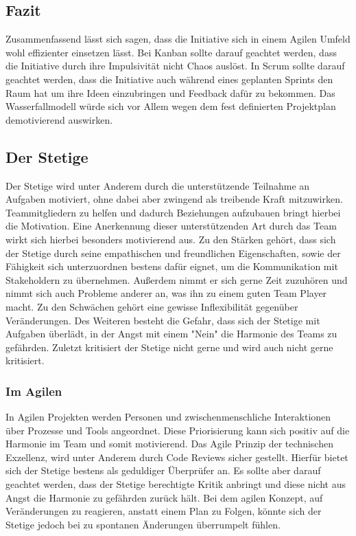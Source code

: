 \documentclass[twocolumn,10pt]{asme2ej}
\begin{document}
\subsection{Fazit}
Zusammenfassend lässt sich sagen, dass die Initiative sich in einem Agilen Umfeld wohl effizienter einsetzen lässt. Bei Kanban sollte darauf geachtet werden, dass die Initiative durch ihre Impulsivität nicht Chaos auslöst. In Scrum sollte darauf geachtet werden, dass die Initiative auch während eines geplanten Sprints den Raum hat um ihre Ideen einzubringen und Feedback dafür zu bekommen. Das Wasserfallmodell würde sich vor Allem wegen dem fest definierten Projektplan demotivierend auswirken. 


\subsection{Der Stetige}
Der Stetige wird unter Anderem durch die unterstützende Teilnahme an Aufgaben motiviert, ohne dabei aber zwingend als treibende Kraft mitzuwirken. Teammitgliedern zu helfen und dadurch Beziehungen aufzubauen bringt hierbei die Motivation. Eine Anerkennung dieser unterstützenden Art durch das Team wirkt sich hierbei besonders motivierend aus. Zu den Stärken gehört, dass sich der Stetige durch seine empathischen und freundlichen Eigenschaften, sowie der Fähigkeit sich unterzuordnen bestens dafür eignet, um die Kommunikation mit Stakeholdern zu übernehmen. Außerdem nimmt er sich gerne Zeit zuzuhören und nimmt sich auch Probleme anderer an, was ihn zu einem guten Team Player macht. Zu den Schwächen gehört eine gewisse Inflexibilität gegenüber Veränderungen. Des Weiteren besteht die Gefahr, dass sich der Stetige mit Aufgaben überlädt, in der Angst mit einem "Nein" die Harmonie des Teams zu gefährden. Zuletzt kritisiert der Stetige nicht gerne und wird auch nicht gerne kritisiert.

\subsubsection{Im Agilen}
In Agilen Projekten werden Personen und zwischenmenschliche Interaktionen über Prozesse und Tools angeordnet. Diese Priorisierung kann sich positiv auf die Harmonie im Team und somit motivierend. Das Agile Prinzip der technischen Exzellenz, wird unter Anderem durch Code Reviews sicher gestellt. Hierfür bietet sich der Stetige bestens als geduldiger Überprüfer an. Es sollte aber darauf geachtet werden, dass der Stetige berechtigte Kritik anbringt und diese nicht aus Angst die Harmonie zu gefährden zurück hält. Bei dem agilen Konzept, auf Veränderungen zu reagieren, anstatt einem Plan zu Folgen, könnte sich der Stetige jedoch bei zu spontanen Änderungen überrumpelt fühlen.
\end{document}
